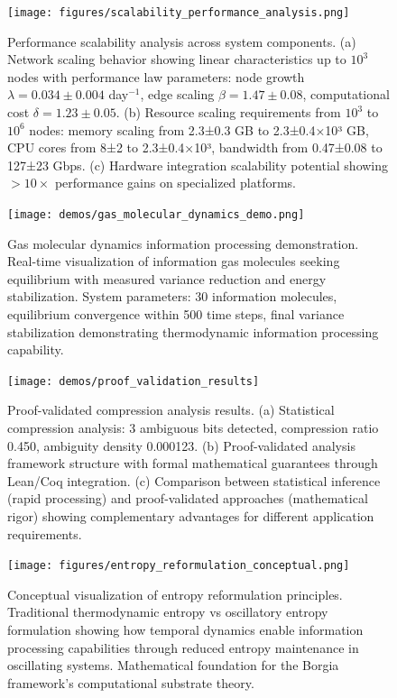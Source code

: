 \begin{figure}[H]
\centering
\texttt{[image: figures/scalability\_performance\_analysis.png]}
\caption{Performance scalability analysis across system components. (a) Network scaling behavior showing linear characteristics up to $10^3$ nodes with performance law parameters: node growth $\lambda = 0.034 \pm 0.004$ day$^{-1}$, edge scaling $\beta = 1.47 \pm 0.08$, computational cost $\delta = 1.23 \pm 0.05$. (b) Resource scaling requirements from $10^3$ to $10^6$ nodes: memory scaling from 2.3±0.3 GB to 2.3±0.4×10³ GB, CPU cores from 8±2 to 2.3±0.4×10³, bandwidth from 0.47±0.08 to 127±23 Gbps. (c) Hardware integration scalability potential showing $> 10 \times$ performance gains on specialized platforms.}
\label{fig:scalability_analysis}
\end{figure}


\begin{figure}[H]
\centering
\texttt{[image: demos/gas\_molecular\_dynamics\_demo.png]}
\caption{Gas molecular dynamics information processing demonstration. Real-time visualization of information gas molecules seeking equilibrium with measured variance reduction and energy stabilization. System parameters: 30 information molecules, equilibrium convergence within 500 time steps, final variance stabilization demonstrating thermodynamic information processing capability.}
\label{fig:gas_molecular_demo}
\end{figure}

\begin{figure}[H]
\centering
\texttt{[image: demos/proof\_validation\_results]}
\caption{Proof-validated compression analysis results. (a) Statistical compression analysis: 3 ambiguous bits detected, compression ratio 0.450, ambiguity density 0.000123. (b) Proof-validated analysis framework structure with formal mathematical guarantees through Lean/Coq integration. (c) Comparison between statistical inference (rapid processing) and proof-validated approaches (mathematical rigor) showing complementary advantages for different application requirements.}
\label{fig:proof_validation_demo}
\end{figure}

\begin{figure}[H]
\centering
\texttt{[image: figures/entropy\_reformulation\_conceptual.png]}
\caption{Conceptual visualization of entropy reformulation principles. Traditional thermodynamic entropy vs oscillatory entropy formulation showing how temporal dynamics enable information processing capabilities through reduced entropy maintenance in oscillating systems. Mathematical foundation for the Borgia framework's computational substrate theory.}
\label{fig:entropy_conceptual}
\end{figure}

